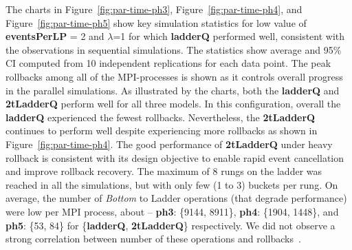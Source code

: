 The charts in Figure~\ref{fig:par-time-ph3}, Figure~\ref{fig:par-time-ph4}, and Figure~\ref{fig:par-time-ph5} show key simulation statistics for low value of \textbf{eventsPerLP} = 2 and $\lambda$=1 for
which \textbf{ladderQ} performed well, consistent with the observations in sequential simulations. The statistics show average and 95\% CI
computed from 10 independent replications for each data point. The peak rollbacks among all of the MPI-processes is shown as it controls
overall progress in the parallel simulations. As illustrated by the charts, both the \textbf{ladderQ} and
\textbf{2tLadderQ} perform well for all three models. In this configuration, overall the \textbf{ladderQ} experienced the fewest
rollbacks. Nevertheless, the \textbf{2tLadderQ} continues to perform well despite experiencing more rollbacks as shown in
Figure~\ref{fig:par-time-ph4}. The good performance of \textbf{2tLadderQ} under heavy rollback is consistent with its design objective to enable rapid event cancellation and improve rollback recovery. The maximum of 8 rungs on the ladder was reached in all the simulations, but with only few (1 to 3) buckets per rung. On average, the number of \emph{Bottom} to Ladder operations (that degrade performance) were low
per MPI process, about -- \textbf{ph3}: \{9144, 8911\}, \textbf{ph4}: \{1904, 1448\}, and \textbf{ph5}: \{53, 84\} for \{\textbf{ladderQ}, \textbf{2tLadderQ}\} respectively. We did not observe a strong correlation between number of these operations and rollbacks~\cite{higiro2017multi}.


